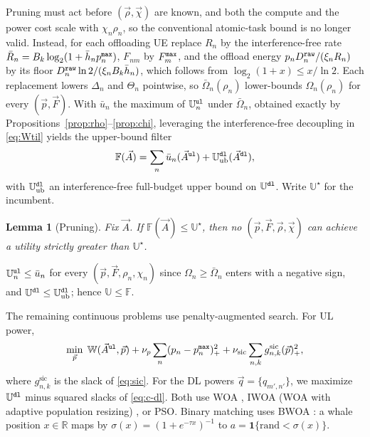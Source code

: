 \documentclass[journal]{IEEEtran}
\newtheorem{lemma}{Lemma}
\begin{document}
Pruning must act before $(\vec{\rho},\vec{\chi})$ are known, and both the compute and the power cost scale with $\chi_n\rho_n$, so the conventional atomic-task bound is no longer valid. Instead, for each offloading UE replace $R_n$ by the interference-free rate $\bar R_n=B_k\log_2(1+\bar h_np_n^{\tt max})$, $F_{nm}$ by $F_m^{\tt max}$, and the offload energy $p_nD_n^{\tt raw}/(\xi_nR_n)$ by its floor $D_n^{\tt raw}\ln2/(\xi_nB_k\bar h_n)$, which follows from $\log_2(1+x)\le x/\ln2$. Each replacement lowers $\Delta_n$ and $\Theta_n$ pointwise, so $\bar\Omega_n(\rho_n)$ lower-bounds $\Omega_n(\rho_n)$ for every $(\vec{p},\vec{F})$. 
With $\bar u_n$ the maximum of $\mathbb{U}_n^{\tt ul}$ under $\bar\Omega_n$, obtained exactly by Propositions~\ref{prop:rho}--\ref{prop:chi}, {\color{blue}leveraging the interference-free decoupling in \eqref{eq:Wtil} yields the upper-bound filter}
\begin{equation}
\mathbb{F}(\vec{A})=\sum_{n}\bar u_n(\vec{A}^{\tt ul})+\mathbb{U}^{\tt dl}_{\mathrm{ub}}(\vec{A}^{\tt dl}),
\label{eq:Fbound}
\end{equation}
with $\mathbb{U}^{\tt dl}_{\mathrm{ub}}$ an interference-free full-budget upper bound on $\mathbb{U}^{\tt dl}$. Write $\mathbb{U}^\star$ for the incumbent.

{\color{blue}\begin{lemma}[Pruning]\label{lem:prune}
Fix $\vec{A}$. If $\mathbb{F}(\vec{A})\le\mathbb{U}^\star$, then no $(\vec{p},\vec{F},\vec{\rho},\vec{\chi})$ can achieve a utility strictly greater than $\mathbb{U}^\star$.
\end{lemma}}
\begin{IEEEproof}
$\mathbb{U}_n^{\tt ul}\le\bar u_n$ for every $(\vec{p},\vec{F},\rho_n,\chi_n)$ since $\Omega_n\ge\bar\Omega_n$ enters with a negative sign, and $\mathbb{U}^{\tt dl}\le\mathbb{U}^{\tt dl}_{\mathrm{ub}}$; hence $\mathbb{U}\le\mathbb{F}$.
\end{IEEEproof}

The remaining continuous problems use penalty-augmented search. For UL power,
\begin{equation}
\min_{\vec{p}}\;
\mathbb{W}(\vec{A}^{\tt ul},\vec{p})
+\nu_p\sum_n(p_n-p_n^{\tt max})_+^2
+\nu_{\mathrm{sic}}\sum_{n,k}g_{n,k}^{\mathrm{sic}}(\vec{p})_+^2,
\label{eq:mpc}
\end{equation}
where $g_{n,k}^{\mathrm{sic}}$ is the slack of \eqref{eq:sic}. For the DL powers $\vec{q}=\{q_{m',n'}\}$, we maximize $\mathbb{U}^{\tt dl}$ minus squared slacks of \eqref{eq:c-dl}. Both use WOA \cite{mirjalili2016whale}, IWOA (WOA with adaptive population resizing) \cite{Hoang_TCOM_2024}, or PSO. Binary matching uses BWOA \cite{kumar2020binary}: a whale position $x\in\mathbb{R}$ maps by $\sigma(x)=(1+e^{-\tau x})^{-1}$ to $a=\mathbf{1}\{\mathrm{rand}<\sigma(x)\}$.
\end{document}
